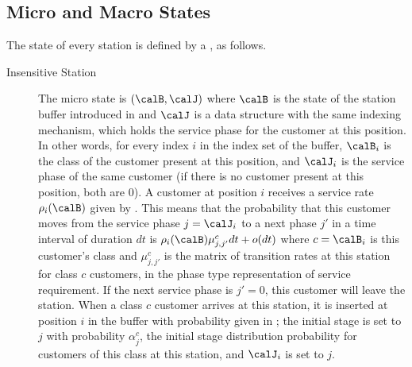 \begin{petit}
\subsection{Micro and Macro States}
\label{sec-micro}
The state of every station is defined by a
, as follows.
\begin{description}
\item[Insensitive Station] The micro state is
$(\calB, \calJ)$ where $\calB$ is the state of
the station buffer introduced in
 and $\calJ$ is a data
structure with the same indexing mechanism, which
holds the service phase for the customer at this
position. In other words, for every index $i$ in
the index set of the buffer, $\calB_i$ is the
class of the customer present at this position,
and $\calJ_i$ is the service phase of the same
customer (if there is no customer present at this
position, both are $0$). A customer at position
$i$ receives a service rate $\rho_i(\calB)$ given
by . This means that the
probability that
 this customer moves from the service phase
 $j=\calJ_i$ to a next phase $j'$ in a time interval of duration
$dt$ is $\rho_i(\calB) \mu^c_{j,j'}dt + o(dt)$
where $c=\calB_i$ is this customer's class and
$\mu^c_{j,j'}$ is the matrix of transition rates
at this station for class $c$ customers, in the
phase type representation of service requirement.
If the next service phase is $j'=0$, this
customer will leave the station. When a class $c$
customer arrives at this station, it is inserted
at position $i$ in the buffer with probability
given in ; the initial
stage is set to $j$  with probability
$\alpha^c_j$, the initial stage distribution
probability for customers of this class at this
station, and $\calJ_i$ is set to $j$.


\end{description}
\end{petit}
